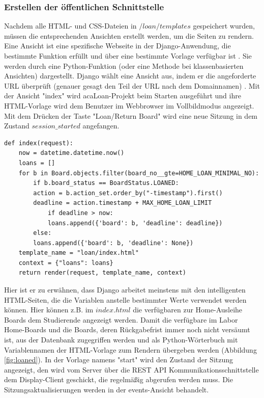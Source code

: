 \subsubsection{Erstellen der öffentlichen Schnittstelle}
\label{sec:server:design:views}
Nachdem alle HTML- und CSS-Dateien in $/loan/templates$ gespeichert wurden, müssen  die entsprechenden Ansichten erstellt werden, um die Seiten zu rendern. Eine Ansicht ist eine spezifische Webseite in der Django-Anwendung, die bestimmte Funktion erfüllt und über eine bestimmte Vorlage verfügbar ist \cite{website:166:temp}. Sie werden durch eine Python-Funktion (oder eine Methode bei klassenbasierten Ansichten) dargestellt. Django wählt eine Ansicht aus, indem er die angeforderte URL überprüft (genauer gesagt den Teil der URL nach dem Domainnamen) \cite{website:166:temp}. Mit der Ansicht "index" wird acaLoan-Projekt beim Starten ausgeführt und ihre HTML-Vorlage wird dem Benutzer im Webbrowser im Vollbildmodus angezeigt. Mit dem Drücken der Taste "Loan/Return Board" wird eine neue Sitzung in dem Zustand $session\_started$ angefangen. 
\begin{lstlisting}[caption={Index-Ansicht in Django},captionpos=b]
def index(request):
	now = datetime.datetime.now()
	loans = []
	for b in Board.objects.filter(board_no__gte=HOME_LOAN_MINIMAL_NO):	
		if b.board_status == BoardStatus.LOANED:
		action = b.action_set.order_by("-timestamp").first()
		deadline = action.timestamp + MAX_HOME_LOAN_LIMIT	
			if deadline > now:
			loans.append({'board': b, 'deadline': deadline})
		else:
		loans.append({'board': b, 'deadline': None})	
	template_name = "loan/index.html"
	context = {"loans": loans}
	return render(request, template_name, context)
\end{lstlisting}
Hier ist er zu erwähnen, dass Django arbeitet meinstens mit den intelligenten HTML-Seiten, die die Variablen anstelle bestimmter Werte verwendet werden können. Hier können z.B. im $index.html$ die verfügbaren zur Home-Ausleihe Boards dem Studierende angezeigt werden. Damit die verfügbare im Labor Home-Boards und die Boards, deren Rückgabefrist immer noch nicht versäumt ist, aus der Datenbank zugegriffen werden und als Python-Wörterbuch mit Variablennamen der HTML-Vorlage zum Rendern übergeben werden (Abbildung \ref{fig:loaned}). In der Vorlage namens "start" wird den Zustand der Sitzung angezeigt, den wird vom Server über die REST API Kommunikationsschnittstelle dem Display-Client geschickt, die regelmäßig abgerufen werden muss. Die Sitzungsaktualisierungen werden in der events-Ansicht behandelt. 

